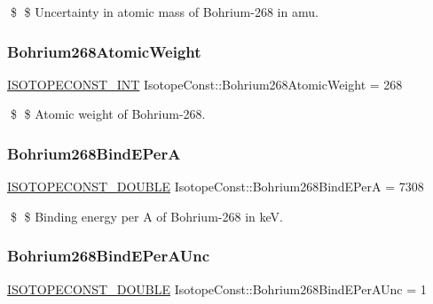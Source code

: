 \$ \$ Uncertainty in atomic mass of Bohrium-\/268 in amu. \mbox{\label{group___isotope_const-_bohrium-_bh268_ga55dde9f82434b9906305d31cb42490d0}} 
\subsubsection{\texorpdfstring{Bohrium268\+Atomic\+Weight}{Bohrium268AtomicWeight}}
{\footnotesize\ttfamily \mbox{\hyperlink{group___isotope_const-_macros_ga5f18360b3e99483a35c32d789e62621c}{I\+S\+O\+T\+O\+P\+E\+C\+O\+N\+S\+T\+\_\+\+I\+NT}} Isotope\+Const\+::\+Bohrium268\+Atomic\+Weight = 268}

\$ \$ Atomic weight of Bohrium-\/268. \mbox{\label{group___isotope_const-_bohrium-_bh268_ga1cd50e84fbe492afb450262504402d92}} 
\subsubsection{\texorpdfstring{Bohrium268\+Bind\+E\+PerA}{Bohrium268BindEPerA}}
{\footnotesize\ttfamily \mbox{\hyperlink{group___isotope_const-_macros_ga8f45a7272ce02c0b4c65c44636ed719a}{I\+S\+O\+T\+O\+P\+E\+C\+O\+N\+S\+T\+\_\+\+D\+O\+U\+B\+LE}} Isotope\+Const\+::\+Bohrium268\+Bind\+E\+PerA = 7308}

\$ \$ Binding energy per A of Bohrium-\/268 in keV. \mbox{\label{group___isotope_const-_bohrium-_bh268_ga9b7547d05456773177743bc1e0cd87f1}} 
\subsubsection{\texorpdfstring{Bohrium268\+Bind\+E\+Per\+A\+Unc}{Bohrium268BindEPerAUnc}}
{\footnotesize\ttfamily \mbox{\hyperlink{group___isotope_const-_macros_ga8f45a7272ce02c0b4c65c44636ed719a}{I\+S\+O\+T\+O\+P\+E\+C\+O\+N\+S\+T\+\_\+\+D\+O\+U\+B\+LE}} Isotope\+Const\+::\+Bohrium268\+Bind\+E\+Per\+A\+Unc = 1}

